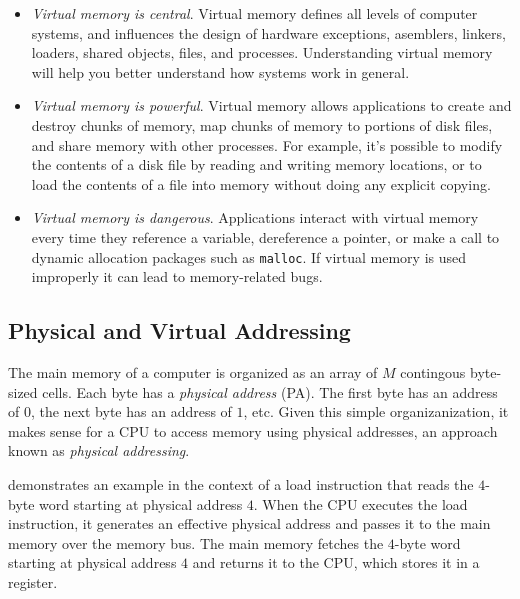 \documentclass[12pt]{article}
\begin{document}
\begin{itemize}
    \item \textit{Virtual memory is central}. Virtual memory defines all levels of computer systems, and influences the design of hardware exceptions, asemblers, linkers, loaders, shared objects, files, and processes. Understanding virtual memory will help you better understand how systems work in general.
    \item \textit{Virtual memory is powerful}. Virtual memory allows applications to create and destroy chunks of memory, map chunks of memory to portions of disk files, and share memory with other processes. For example, it's possible to modify the contents of a disk file by reading and writing memory locations, or to load the contents of a file into memory without doing any explicit copying.
    \item \textit{Virtual memory is dangerous}. Applications interact with virtual memory every time they reference a variable, dereference a pointer, or make a call to dynamic allocation packages such as \lstinline{malloc}. If virtual memory is used improperly it can lead to memory-related bugs.
\end{itemize}

\subsection{Physical and Virtual Addressing}

The main memory of a computer is organized as an array of $M$ contingous byte-sized cells. Each byte has a \textit{physical address} (PA). The first byte has an address of $0$, the next byte has an address of $1$, etc. Given this simple organizanization, it makes sense for a CPU to access memory using physical addresses, an approach known as \textit{physical addressing}.

 demonstrates an example in the context of a load instruction that reads the $4$-byte word starting at physical address $4$. When the CPU executes the load instruction, it generates an effective physical address and passes it to the main memory over the memory bus. The main memory fetches the $4$-byte word starting at physical address $4$ and returns it to the CPU, which stores it in a register.
\end{document}
